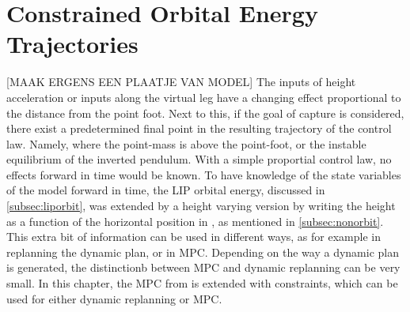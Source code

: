 %
\chapter{Constrained Orbital Energy Trajectories}
[MAAK ERGENS EEN PLAATJE VAN MODEL] The inputs of height acceleration or inputs along the virtual leg have a changing effect proportional to the distance from the point foot. Next to this, if the goal of capture is considered, there exist a predetermined final point in the resulting trajectory of the control law. Namely, where the point-mass is above the point-foot, or the instable equilibrium of the inverted pendulum. With a simple proportial control law, no effects forward in time would be known. To have knowledge of the state variables of the model forward in time, the \ac{LIP} orbital energy, discussed in \ref{subsec:liporbit}, was extended by a height varying version by writing the height as a function of the horizontal position in  \cite{pratt2007derivation}, as mentioned in \ref{subsec:nonorbit}. This extra bit of information can be used in different ways, as for example in replanning the dynamic plan, or in \ac{MPC}. Depending on the way a dynamic plan is generated, the distinctionb between \ac{MPC} and dynamic replanning can be very small. In this chapter, the \ac{MPC} from \cite{koolen2016balance} is extended with constraints, which can be used for either dynamic replanning or \ac{MPC}.

